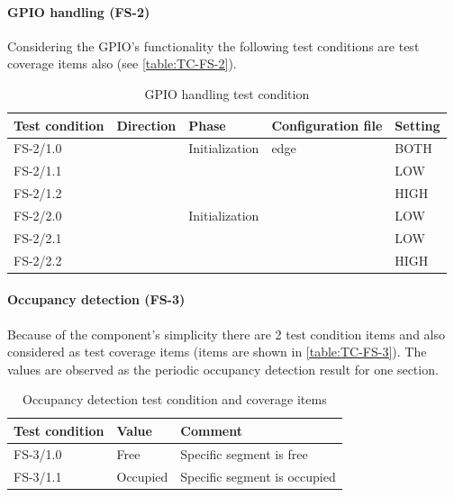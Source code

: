\paragraph{GPIO handling (FS-2)}
Considering the GPIO's functionality the following test conditions are test coverage items also (see \autoref{table:TC-FS-2}).
\begin{table}[H]
	\caption{GPIO handling test condition}
	\label{table:TC-FS-2}
	\begin{center}
		\renewcommand{\arraystretch}{1.8}
		\begin{tabu} 
			to 0.9 \textwidth
			{  X[c] X[c] X[c] X[c] X[c] }
			\toprule
			Test condition & Direction                     & Phase                            & Configuration file           & Setting \\ \midrule
			FS-2/1.0       &   & Initialization                   & edge                         & BOTH    \\
			FS-2/1.1       &                               &  &  & LOW     \\
			FS-2/1.2       &                               &                                  &                              & HIGH    \\
			FS-2/2.0       &  & Initialization                   &  & LOW     \\
			FS-2/2.1       &                               &  &                              & LOW    \\
			FS-2/2.2       &                               &                                  &                              & HIGH     \\ \bottomrule
		\end{tabu}
	\end{center}
\end{table} 

\paragraph{Occupancy detection (FS-3)}
Because of the component's simplicity there are 2 test condition items and also considered as test coverage items (items are shown in \autoref{table:TC-FS-3}). The values are observed as the periodic occupancy detection result for one section.
\begin{table}[H]
	\caption{Occupancy detection test condition and coverage items}
	\label{table:TC-FS-3}
	\begin{center}
		\renewcommand{\arraystretch}{1.8}
		\begin{tabu} 
			to 0.9 \textwidth
			{  X[c] X[c] X[c] }
			\toprule
			Test condition & Value    & Comment             \\ \midrule
			FS-3/1.0       & Free     & Specific segment is free     \\
			FS-3/1.1       & Occupied & Specific segment is occupied \\ \bottomrule
		\end{tabu}
	\end{center}
\end{table}


